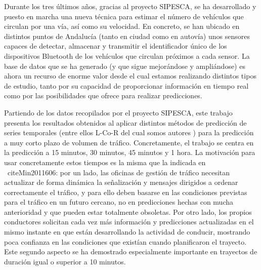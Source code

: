 \documentclass[twocolumn]{maeb2015}
\begin{document}
Durante los tres últimos años, gracias al proyecto SIPESCA, se ha desarrollado y puesto en marcha una nueva técnica para estimar el número de vehículos que circulan por una vía, así como su velocidad. En concreto, se han ubicado en distintos puntos de Andalucía (tanto en ciudad como en autovía) unos sensores capaces de detectar, almacenar y transmitir el identificador único de los dispositivos Bluetooth de los vehículos que circulan próximos a cada sensor. La base de datos que se ha generado (y que sigue mejorándose y ampliándose) es ahora un recurso de enorme valor desde el cual estamos realizando distintos tipos de estudio, tanto por su capacidad de proporcionar información en tiempo real como por las posibilidades que ofrece para realizar predicciones.

Partiendo de los datos recopilados por el proyecto SIPESCA, este trabajo presenta los resultados obtenidos al aplicar distintos métodos de predicción de series temporales (entre ellos {L-Co-R} del cual somos autores \cite{LCOR}) para la predicción a muy corto plazo de volumen de tráfico. Concretamente, el trabajo se centra en la predicción a 15 minutos, 30 minutos, 45 minutos y 1 hora. La motivación para usar concretamente estos tiempos es la misma que la indicada en ~cite{Min2011606}: por un lado, las oficinas de gestión de tráfico necesitan actualizar de forma dinámica la señalización y mensajes dirigidos a ordenar correctamente el tráfico, y para ello deben basarse en las condiciones previstas para el tráfico en un futuro cercano, no en predicciones hechas con mucha anterioridad y que pueden estar totalmente obsoletas. Por otro lado, los propios conductores solicitan cada vez más información y predicciones actualizadas en el mismo instante en que están desarrollando la actividad de conducir, mostrando poca confianza en las condiciones que existían cuando planificaron el trayecto. Este segundo aspecto se ha demostrado especialmente importante en trayectos de duración igual o superior a 10 minutos.
\end{document}
